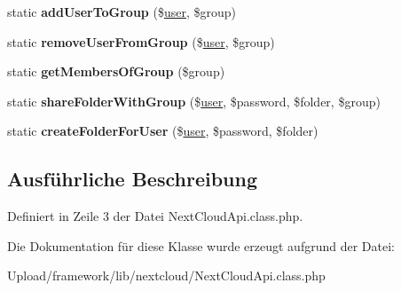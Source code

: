 \begin{DoxyCompactItemize}
static {\bfseries add\+User\+To\+Group} (\$\mbox{\hyperlink{classuser}{user}}, \$group)
\item 
\mbox{\label{class_next_cloud_api_a5bb4020dd98d252f34d62cd99573c58c}} 
static {\bfseries remove\+User\+From\+Group} (\$\mbox{\hyperlink{classuser}{user}}, \$group)
\item 
\mbox{\label{class_next_cloud_api_a688a62cec615e64f75ce6426dea28948}} 
static {\bfseries get\+Members\+Of\+Group} (\$group)
\item 
\mbox{\label{class_next_cloud_api_a74a9194dd0f760db4eaaffa67e4b3a96}} 
static {\bfseries share\+Folder\+With\+Group} (\$\mbox{\hyperlink{classuser}{user}}, \$password, \$folder, \$group)
\item 
\mbox{\label{class_next_cloud_api_a9a9e91d069cc0c384e4b9d8f6ca3b4ab}} 
static {\bfseries create\+Folder\+For\+User} (\$\mbox{\hyperlink{classuser}{user}}, \$password, \$folder)
\end{DoxyCompactItemize}


\subsection{Ausführliche Beschreibung}


Definiert in Zeile 3 der Datei Next\+Cloud\+Api.\+class.\+php.



Die Dokumentation für diese Klasse wurde erzeugt aufgrund der Datei\+:\begin{DoxyCompactItemize}
\item 
Upload/framework/lib/nextcloud/Next\+Cloud\+Api.\+class.\+php\end{DoxyCompactItemize}

